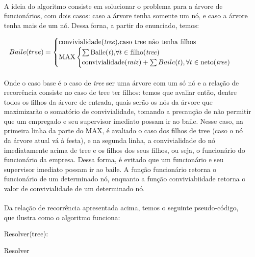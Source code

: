 \documentclass[a4paper]{article}
\begin{document}
\paragraph{} A ideia do algoritmo consiste em solucionar o problema para a árvore de funcionários, com dois casos: caso a árvore tenha somente um nó, e caso a árvore tenha mais de um nó. Dessa forna, a partir do enunciado, temos:


\begin{equation}
	Baile(tree) = \begin{cases}
		\text{convivialidade(\textit{tree}),}  \text{caso tree não tenha filhos}\\
		\text{MAX}  \begin{cases}
			\sum \text{Baile(\textit{t}),}  \forall t \in \text{filho(\textit{tree})}\\
			\text{convivialidade(\textit{raiz})} + \sum  Baile(t), \forall t \in \text{neto(\textit{tree})}
			\end{cases}
		\end{cases}
\end{equation}
\paragraph{}Onde o caso base é o caso de \textit{tree} ser uma árvore com um só nó e a relação de recorrência consiste no caso de tree ter filhos: temos que avaliar então, dentre todos os filhos da árvore de entrada, quais serão os nós da árvore que maximizarão o somatório de convivialidade, tomando a precaução de não permitir que um empregado e seu supervisor imediato possam ir ao baile. Nesse caso, na primeira linha da parte do MAX, é avaliado o caso dos filhos de tree (caso o nó da árvore atual vá à festa), e na segunda linha, a convivialidade do nó imediatamente acima de tree e os filhos dos seus filhos, ou seja, o funcionário do funcionário da empresa. Dessa forma, é evitado que um funcionário e seu supervisor imediato possam ir ao baile. A função funcionário retorna o funcionário de um determinado nó, enquanto a função conviviabiidade retorna o valor de convivialidade de um determinado nó.\\
\paragraph{}Da relação de recorrência apresentada acima, temos o seguinte pseudo-código, que ilustra como o algoritmo funciona:

\begin{algorithm}
\DontPrintSemicolon
{}
Resolver(tree):\;
\caption{{\sc Resolver}}
\label{alg:resolver}
\end{algorithm}
\end{document}
